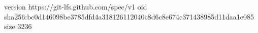 version https://git-lfs.github.com/spec/v1
oid sha256:bc0d146098be3785dfd4a318126112040c8d6c8e674c371438985d11daa1e085
size 3236
